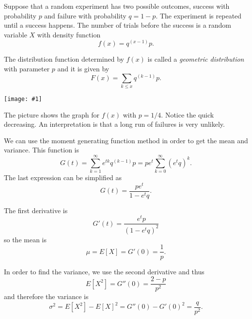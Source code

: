 \documentclass[12pt]{article}
\newcommand{\figura}[1]{\begin{center}\texttt{[image: \#1]}\end{center}}
\begin{document}
Suppose that a random experiment has two possible outcomes, success with probability $p$ and failure with probability $q=1-p$. The experiment is repeated until a success happens. The number of trials before the success is a random variable $X$ with density function 
$$f(x)=q^{(x-1)}p.$$

The distribution function determined by $f(x)$ is called a \emph{geometric distribution} with parameter $p$ and it is given by
$$F(x) = \sum_{k\leq x}q^{(k-1)}p.$$

\figura{geomet}

The picture shows the graph for $f(x)$ with $p=1/4$. Notice the quick decreasing. An interpretation is that a long run of failures is very unlikely.

We can use the moment generating function method in order to get the mean and variance. This function is 
$$G(t)=\sum_{k=1}^\infty e^{tk}q^{(k-1)}p=pe^t\sum_{k=0}^\infty (e^tq)^k.$$
The last expression can be simplified as
$$G(t)=\frac{pe^t}{1-e^tq}.$$

The first  derivative is
$$G'(t)=\frac{e^tp}{(1-e^tq)^2}$$ 
so the mean is
$$\mu=E[X]=G'(0)=\frac{1}{p}.$$

In order to find the variance, we use the second derivative and thus
$$E[X^2]=G''(0)=\frac{2-p}{p^2}$$
and therefore the variance is
$$\sigma^2=E[X^2]-E[X]^2 = G''(0) - G'(0)^2 = \frac{q}{p^2}.$$
\end{document}
